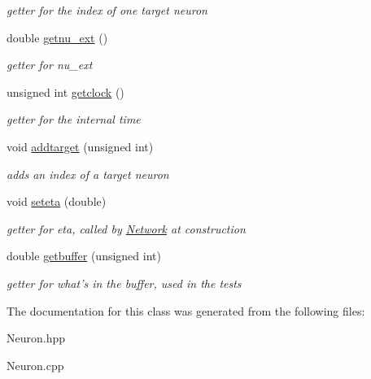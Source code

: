 \begin{DoxyCompactItemize}
\begin{DoxyCompactList}\small\item\em getter for the index of one target neuron \end{DoxyCompactList}\item 
\hypertarget{classNeuron_abc29be4d04a1c952070d67036a4010e0}{double \hyperlink{classNeuron_abc29be4d04a1c952070d67036a4010e0}{getnu\-\_\-ext} ()}\label{classNeuron_abc29be4d04a1c952070d67036a4010e0}

\begin{DoxyCompactList}\small\item\em getter for nu\-\_\-ext \end{DoxyCompactList}\item 
\hypertarget{classNeuron_affcea16a9b974ea539c00ed834c3c984}{unsigned int \hyperlink{classNeuron_affcea16a9b974ea539c00ed834c3c984}{getclock} ()}\label{classNeuron_affcea16a9b974ea539c00ed834c3c984}

\begin{DoxyCompactList}\small\item\em getter for the internal time \end{DoxyCompactList}\item 
\hypertarget{classNeuron_ae300dfe867eebebf0124fc92278f6571}{void \hyperlink{classNeuron_ae300dfe867eebebf0124fc92278f6571}{addtarget} (unsigned int)}\label{classNeuron_ae300dfe867eebebf0124fc92278f6571}

\begin{DoxyCompactList}\small\item\em adds an index of a target neuron \end{DoxyCompactList}\item 
\hypertarget{classNeuron_add534f0458a7e6710bb6cecfbb954630}{void \hyperlink{classNeuron_add534f0458a7e6710bb6cecfbb954630}{seteta} (double)}\label{classNeuron_add534f0458a7e6710bb6cecfbb954630}

\begin{DoxyCompactList}\small\item\em getter for eta, called by \hyperlink{classNetwork}{Network} at construction \end{DoxyCompactList}\item 
\hypertarget{classNeuron_a23f8dbecfc862d906fbfe89ae69cf227}{double \hyperlink{classNeuron_a23f8dbecfc862d906fbfe89ae69cf227}{getbuffer} (unsigned int)}\label{classNeuron_a23f8dbecfc862d906fbfe89ae69cf227}

\begin{DoxyCompactList}\small\item\em getter for what's in the buffer, used in the tests \end{DoxyCompactList}\end{DoxyCompactItemize}


The documentation for this class was generated from the following files\-:\begin{DoxyCompactItemize}
\item 
Neuron.\-hpp\item 
Neuron.\-cpp\end{DoxyCompactItemize}
